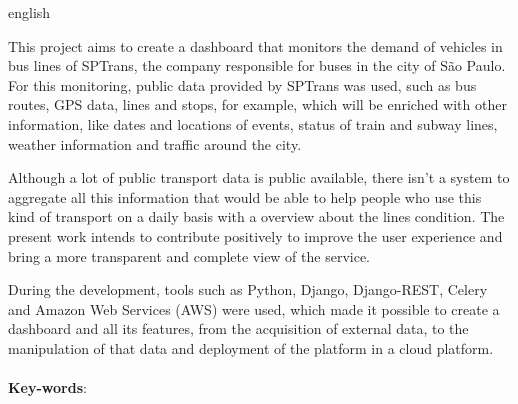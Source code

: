 \begin{resumo}[Abstract]
	\begin{otherlanguage*}{english}
	\indent
	\par This project aims to create a dashboard that monitors the demand of vehicles in bus lines of SPTrans, the company responsible for buses in the city of São Paulo. For this monitoring, public data provided by SPTrans was used, such as bus routes, GPS data, lines and stops, for example, which will be enriched with other information, like dates and locations of events, status of train and subway lines, weather information and traffic around the city.
	\par Although a lot of public transport data is public available, there isn’t a system to aggregate all this information that would be able to help people who use this kind of transport on a daily basis with a overview about the lines condition. The present work intends to contribute positively to improve the user experience and bring a more transparent and complete view of the service.
	\par During the development, tools such as Python, Django, Django-REST, Celery and Amazon Web Services (AWS) were used, which made it possible to create a dashboard and all its features, from the acquisition of external data, to the manipulation of that data and deployment of the platform in a cloud platform.
	\\
	\\
	\textbf{Key-words}: ~
	\end{otherlanguage*}
\end{resumo}
